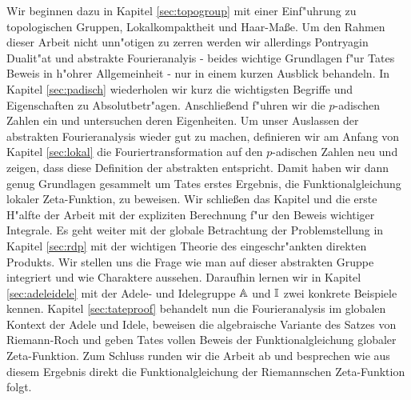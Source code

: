 	Wir beginnen dazu in Kapitel \ref{sec:topogroup} mit einer Einf"uhrung zu topologischen Gruppen, Lokalkompaktheit und Haar-Maße. 
	Um den Rahmen dieser Arbeit nicht unn"otigen zu zerren werden wir allerdings Pontryagin Dualit"at und abstrakte Fourieranalyis - beides wichtige Grundlagen f"ur Tates Beweis in h"ohrer Allgemeinheit - nur in einem kurzen Ausblick behandeln.
	In Kapitel \ref{sec:padisch} wiederholen wir kurz die wichtigsten Begriffe und Eigenschaften zu Absolutbetr"agen. 
	Anschließend f"uhren wir die $p$-adischen Zahlen ein und untersuchen deren Eigenheiten.
	Um unser Auslassen der abstrakten Fourieranalysis wieder gut zu machen, definieren wir am Anfang von Kapitel \ref{sec:lokal} die Fouriertransformation auf den $p$-adischen Zahlen neu und zeigen, dass diese Definition der abstrakten entspricht. 
	Damit haben wir dann genug Grundlagen gesammelt um Tates erstes Ergebnis, die Funktionalgleichung lokaler Zeta-Funktion, zu beweisen.
	Wir schließen das Kapitel und die erste H"alfte der Arbeit mit der expliziten Berechnung f"ur den Beweis wichtiger Integrale.
	Es geht weiter mit der globale Betrachtung der Problemstellung in Kapitel \ref{sec:rdp} mit der wichtigen Theorie des eingeschr"ankten direkten Produkts.
	Wir stellen uns die Frage wie man auf dieser abstrakten Gruppe integriert und wie Charaktere aussehen.
	Daraufhin lernen wir in Kapitel \ref{sec:adeleidele} mit der Adele- und Idelegruppe $\mathbb{A}$ und $\mathbb{I}$ zwei konkrete Beispiele kennen.
	Kapitel \ref{sec:tateproof} behandelt nun die Fourieranalysis im globalen Kontext der Adele und Idele, beweisen die algebraische Variante des Satzes von Riemann-Roch und geben Tates vollen Beweis der Funktionalgleichung globaler Zeta-Funktion. 
	Zum Schluss runden wir die Arbeit ab und besprechen wie aus diesem Ergebnis direkt die Funktionalgleichung der Riemannschen Zeta-Funktion folgt.
	
	
	
	
	


